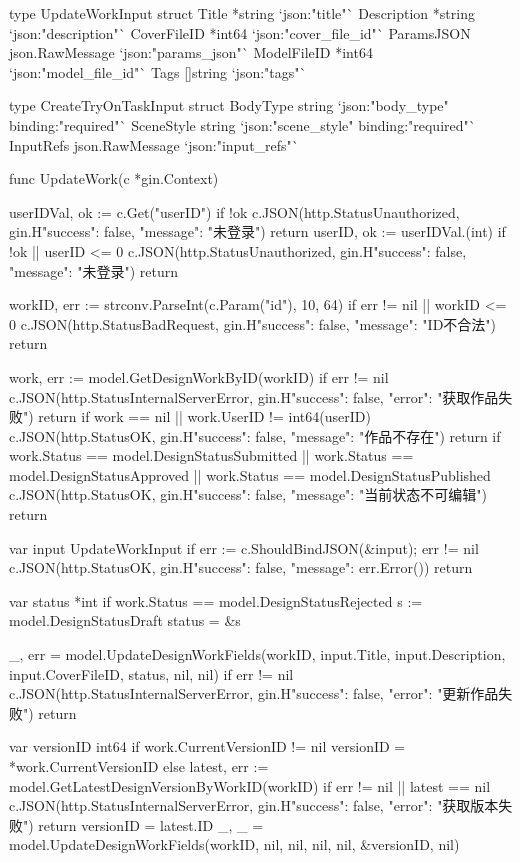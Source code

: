 \documentclass[twoside]{thesis-cls-Miya} %
\begin{document}
type UpdateWorkInput struct {
	Title       *string         `json:"title"`
	Description *string         `json:"description"`
	CoverFileID *int64          `json:"cover_file_id"`
	ParamsJSON  json.RawMessage `json:"params_json"`
	ModelFileID *int64          `json:"model_file_id"`
	Tags        []string        `json:"tags"`
}

type CreateTryOnTaskInput struct {
	BodyType   string          `json:"body_type" binding:"required"`
	SceneStyle string          `json:"scene_style" binding:"required"`
	InputRefs  json.RawMessage `json:"input_refs"`
}

func UpdateWork(c *gin.Context) {
	userIDVal, ok := c.Get("userID")
	if !ok {
		c.JSON(http.StatusUnauthorized, gin.H{"success": false, "message": "未登录"})
		return
	}
	userID, ok := userIDVal.(int)
	if !ok || userID <= 0 {
		c.JSON(http.StatusUnauthorized, gin.H{"success": false, "message": "未登录"})
		return
	}

	workID, err := strconv.ParseInt(c.Param("id"), 10, 64)
	if err != nil || workID <= 0 {
		c.JSON(http.StatusBadRequest, gin.H{"success": false, "message": "ID不合法"})
		return
	}

	work, err := model.GetDesignWorkByID(workID)
	if err != nil {
		c.JSON(http.StatusInternalServerError, gin.H{"success": false, "error": "获取作品失败"})
		return
	}
	if work == nil || work.UserID != int64(userID) {
		c.JSON(http.StatusOK, gin.H{"success": false, "message": "作品不存在"})
		return
	}
	if work.Status == model.DesignStatusSubmitted || work.Status == model.DesignStatusApproved || work.Status == model.DesignStatusPublished {
		c.JSON(http.StatusOK, gin.H{"success": false, "message": "当前状态不可编辑"})
		return
	}

	var input UpdateWorkInput
	if err := c.ShouldBindJSON(&input); err != nil {
		c.JSON(http.StatusOK, gin.H{"success": false, "message": err.Error()})
		return
	}

	var status *int
	if work.Status == model.DesignStatusRejected {
		s := model.DesignStatusDraft
		status = &s
	}

	_, err = model.UpdateDesignWorkFields(workID, input.Title, input.Description, input.CoverFileID, status, nil, nil)
	if err != nil {
		c.JSON(http.StatusInternalServerError, gin.H{"success": false, "error": "更新作品失败"})
		return
	}

	var versionID int64
	if work.CurrentVersionID != nil {
		versionID = *work.CurrentVersionID
	} else {
		latest, err := model.GetLatestDesignVersionByWorkID(workID)
		if err != nil || latest == nil {
			c.JSON(http.StatusInternalServerError, gin.H{"success": false, "error": "获取版本失败"})
			return
		}
		versionID = latest.ID
		_, _ = model.UpdateDesignWorkFields(workID, nil, nil, nil, nil, &versionID, nil)
	}

}
\end{document}
